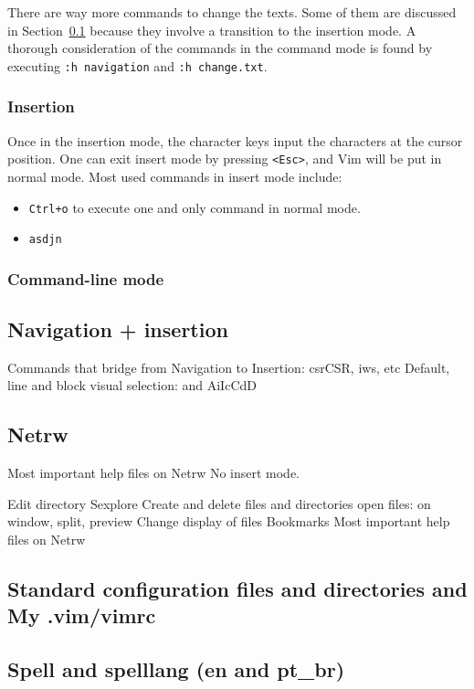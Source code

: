 \documentclass{article}
\begin{document}
There are way more commands to change the texts.
Some of them are discussed in Section~\ref{navIn}
because they involve a transition to the insertion mode.
A thorough consideration of the commands in the command mode
is found by executing \texttt{:h navigation} and 
\texttt{:h change.txt}.

\subsubsection{Insertion}
Once in the insertion mode, the character keys
input the characters at the cursor position.
One can exit insert mode by pressing \texttt{<Esc>},
and Vim will be put in normal mode.
Most used commands in insert mode include:
\begin{itemize}
  \item \texttt{Ctrl+o} to execute one and only command in normal mode.
  \item \texttt{asdjn}
\end{itemize}


\subsubsection{Command-line mode}


\subsection{Navigation + insertion}\label{navIn}
Commands that bridge from Navigation to Insertion:
csrCSR, iws, etc
Default, line and block visual selection:
  and AiIcCdD

\subsection{Netrw}
Most important help files on Netrw
No insert mode.

Edit directory
Sexplore
Create and delete files and directories
open files: on window, split, preview
Change display of files
Bookmarks
Most important help files on Netrw


\subsection{Standard configuration files and directories and My .vim/vimrc}
\subsection{Spell and spelllang (en and pt\_br)}
\end{document}
